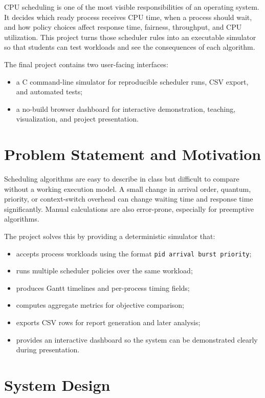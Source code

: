 \documentclass[11pt]{article}
\begin{document}
CPU scheduling is one of the most visible responsibilities of an operating
system. It decides which ready process receives CPU time, when a process should
wait, and how policy choices affect response time, fairness, throughput, and
CPU utilization. This project turns those scheduler rules into an executable
simulator so that students can test workloads and see the consequences of each
algorithm.

The final project contains two user-facing interfaces:

\begin{itemize}
  \item a C command-line simulator for reproducible scheduler runs, CSV export,
  and automated tests;
  \item a no-build browser dashboard for interactive demonstration, teaching,
  visualization, and project presentation.
\end{itemize}

\section{Problem Statement and Motivation}

Scheduling algorithms are easy to describe in class but difficult to compare
without a working execution model. A small change in arrival order, quantum,
priority, or context-switch overhead can change waiting time and response time
significantly. Manual calculations are also error-prone, especially for
preemptive algorithms.

The project solves this by providing a deterministic simulator that:

\begin{itemize}
  \item accepts process workloads using the format \texttt{pid arrival burst priority};
  \item runs multiple scheduler policies over the same workload;
  \item produces Gantt timelines and per-process timing fields;
  \item computes aggregate metrics for objective comparison;
  \item exports CSV rows for report generation and later analysis;
  \item provides an interactive dashboard so the system can be demonstrated
  clearly during presentation.
\end{itemize}

\section{System Design}
\end{document}
